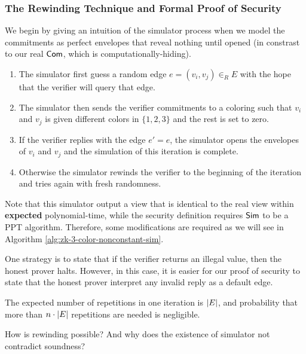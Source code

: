 \subsubsection{The Rewinding Technique and Formal Proof of Security}
We begin by giving an intuition of the simulator process when we model the commitments as perfect envelopes that reveal nothing until opened (in constrast to our real ${\sf Com}$, which is computationally-hiding). 
\begin{enumerate}
\item The simulator first guess a random edge $e=(v_i,v_j)\in_R E$ with the hope that the verifier will query that edge. 
\item The simulator then sends the verifier commitments to a coloring such that $v_i$ and $v_j$ is given different colors in $\{1,2,3\}$ and the rest is set to zero.
\item If the verifier replies with the edge $e'=e$, the simulator opens the envelopes of $v_i$ and $v_j$ and the simulation of this iteration is complete.
\item Otherwise the simulator rewinds the verifier to the beginning of the iteration and tries again with fresh randomness.
\end{enumerate}
Note that this simulator output a view that is identical to the real view within {\bf expected} polynomial-time, while the security definition requires ${\sf Sim}$ to be a PPT algorithm. Therefore, some modifications are required as we will see in Algorithm \ref{alg:zk-3-color-nonconstant-sim}.
\begin{description}[leftmargin=0cm]
\item[On dealing with aborts.] One strategy is to state that if the verifier returns an illegal value, then the honest prover halts. However, in this case, it is easier for our proof of security to state that the honest prover interpret any invalid reply as a default edge.
\end{description}
The expected number of repetitions in one iteration is $\left|E\right|$, and probability that more than $n\cdot\left|E\right|$ repetitions are needed is negligible. 
\begin{remark} How is rewinding possible? And why does the existence of simulator not contradict soundness?
\end{remark}

